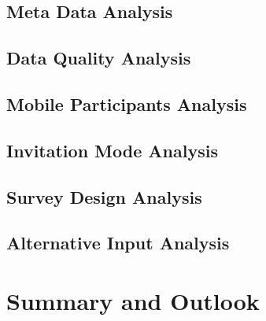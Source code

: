 \documentclass[12pt,a4paper]{article}
\begin{document}
\subsection{Meta Data Analysis}
\label{04_01_meta_data_analysis}


\subsection{Data Quality Analysis}
\label{04_02_data_quality_analysis}


\subsection{Mobile Participants Analysis}
\label{04_03_mobile_participants_analysis}


\subsection{Invitation Mode Analysis}
\label{04_04_invitation_mode_analysis}


\subsection{Survey Design Analysis}
\label{04_05_survey_design_analysis}


\subsection{Alternative Input Analysis}
\label{4_06_alternative_input_analysis}


\section{Summary and Outlook}
\label{05_summary_and_outlook}


\newpage
\printbibliography
\end{document}
